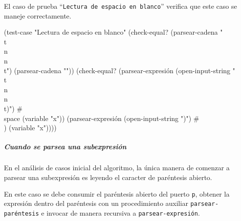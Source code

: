\documentclass[10pt,oneside,openany,letterpaper]{book}
\begin{document}
El caso de prueba ``{\tt{}Lectura\ de\ espacio\ en\ blanco}'' verifica que este caso se maneje correctamente.

\nwenddocs{}\plusendmoddef
(test-case "Lectura de espacio en blanco"
  (check-equal? (parsear-cadena " \\t\\n \\n\\t")
                (parsear-cadena ""))
  (check-equal? (parsear-expresión (open-input-string " \\t\\n \\n\\t)")
                                   #\\space
                                   (variable "x"))
                (parsear-expresión (open-input-string ")") #\\) (variable "x"))))
\nwendcode{}\nwdocspar


\subparagraph{Cuando se parsea una subexpresión} En el análisis de casos inicial del algoritmo, la única manera de comenzar a parsear una subexpresión es leyendo el caracter de paréntesis abierto.

\nwenddocs{}\plusendmoddef
[(char=? #\\( c)
 \LA{}Se leyó un paréntesis abierto~{\nwtagstyle{}\subpageref{NWlam9-Se*V-1}}\RA{}]
\nwendcode{}\nwdocspar

En este caso se debe consumir el paréntesis abierto del puerto {\tt{}p}, obtener la expresión dentro del paréntesis con un procedimiento auxiliar {\tt{}\protect{}\protect{}parsear\protect{}-paréntesis} e invocar de manera recursiva a {\tt{}\protect{}parsear\protect{}-expresión}.
\end{document}
